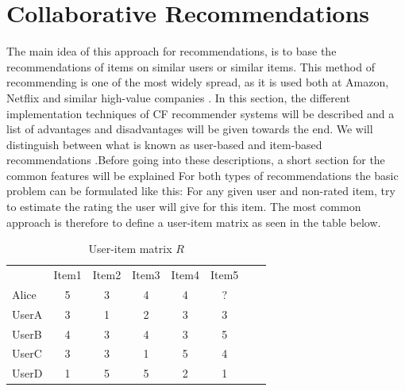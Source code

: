 \section{Collaborative Recommendations}
\label{sec:collaborative}
The main idea of this approach for recommendations, is to base the recommendations of items on similar users or similar items.\newline
This method of recommending is one of the most widely spread, as it is used both at Amazon, Netflix and similar high-value companies \citep{AmazonRecommendations}.\newline
In this section, the different implementation techniques of CF recommender systems will be described and a list of advantages and disadvantages will be given towards the end. We will distinguish between what is known as user-based and item-based recommendations \citep{IntroductionRecommenderSystems}.Before going into these descriptions, a short section for the common features will be explained\newline
For both types of recommendations the basic problem can be formulated like this: For any given user and non-rated item, try to estimate the rating the user will give for this item.\newline
The most common approach is therefore to define a user-item matrix as seen in the table below.


\begin{table}[H]
\begin{center}
\begin{tabular}{l c c c c c c r }
  & Item1 & Item2 & Item3 & Item4 & Item5 \\ 
 Alice & 5 & 3 & 4 & 4 & ? \\
 UserA & 3 & 1 & 2 & 3 & 3 \\
 UserB & 4 & 3 & 4 & 3 & 5 \\
 UserC & 3 & 3 & 1 & 5 & 4 \\
 UserD & 1 & 5 & 5 & 2 & 1
\end{tabular}
\caption{User-item matrix \(R\)}
\label{tableofratings} 
\end{center}
\end{table}




